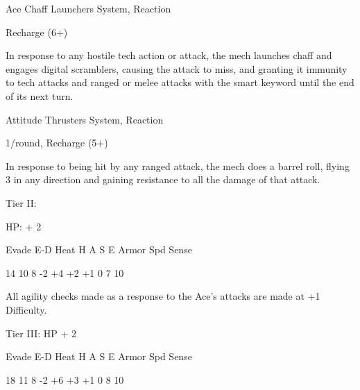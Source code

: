 \begin{npc}{Ace}
Chaff Launchers
System, Reaction

Recharge (6+)

In response to any hostile tech action or attack, the mech launches chaff and engages digital
scramblers, causing the attack to miss, and granting it immunity to tech attacks and ranged or
melee attacks with the smart keyword until the end of its next turn.


Attitude Thrusters
System, Reaction

1/round, Recharge (5+)

In response to being hit by any ranged attack, the mech does a barrel roll, flying 3 in any
direction and gaining resistance to all the damage of that attack.


Tier II:

HP: + 2


          Evade    E-D    Heat    H     A     S    E        Armor       Spd       Sense

          14       10     8       -2    +4    +2   +1       0            7        10

All agility checks made as a response to the Ace’s attacks are made at +1 Difficulty.


Tier III:
HP + 2


          Evade    E-D    Heat    H     A     S    E        Armor       Spd       Sense

          18       11     8       -2    +6    +3   +1       0           8         10


\end{npc}
